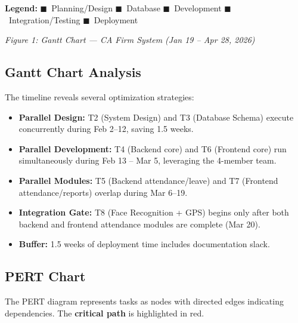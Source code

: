 \documentclass[12pt,a4paper]{article}
\begin{document}
\medskip
\noindent\textbf{Legend:}
\textcolor{phaseA}{$\blacksquare$}~Planning/Design \quad
\textcolor{phaseB}{$\blacksquare$}~Database \quad
\textcolor{phaseC}{$\blacksquare$}~Development \quad
\textcolor{phaseD}{$\blacksquare$}~Integration/Testing \quad
\textcolor{phaseE}{$\blacksquare$}~Deployment

\begin{center}
\small\textit{Figure 1: Gantt Chart --- CA Firm System (Jan 19 -- Apr 28, 2026)}
\end{center}

\subsection{Gantt Chart Analysis}
The timeline reveals several optimization strategies:
\begin{itemize}[noitemsep]
    \item \textbf{Parallel Design:} T2 (System Design) and T3 (Database Schema) execute concurrently during Feb 2--12, saving 1.5 weeks.
    \item \textbf{Parallel Development:} T4 (Backend core) and T6 (Frontend core) run simultaneously during Feb 13 -- Mar 5, leveraging the 4-member team.
    \item \textbf{Parallel Modules:} T5 (Backend attendance/leave) and T7 (Frontend attendance/reports) overlap during Mar 6--19.
    \item \textbf{Integration Gate:} T8 (Face Recognition + GPS) begins only after both backend and frontend attendance modules are complete (Mar 20).
    \item \textbf{Buffer:} 1.5 weeks of deployment time includes documentation slack.
\end{itemize}

\subsection{PERT Chart}
The PERT diagram represents tasks as nodes with directed edges indicating dependencies. The \textcolor{critical}{\textbf{critical path}} is highlighted in red.
\end{document}
